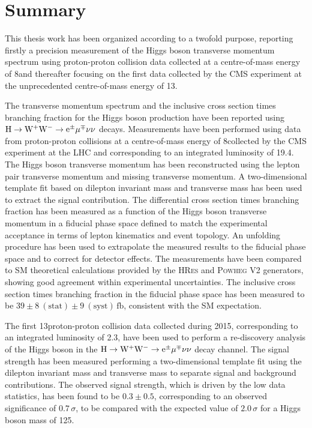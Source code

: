 \chapter*{Summary}
\thispagestyle{empty}

This thesis work has been organized according to a twofold purpose, reporting firstly a precision measurement of the Higgs boson transverse momentum spectrum using proton-proton collision data collected at a centre-of-mass energy of 8\TeV and thereafter focusing on the first data collected by the CMS experiment at the unprecedented centre-of-mass energy of 13\TeV.

The transverse momentum spectrum and the inclusive cross section times branching fraction for the Higgs boson production have been reported using $\rm{H}\to\rm{W^+W^-}\to e^{\pm} \mu^{\mp}\nu\nu$ decays. Measurements have been performed using data from proton-proton collisions at a centre-of-mass energy of 8\TeV collected by the CMS experiment at the LHC and corresponding to an integrated luminosity of 19.4\ifb. The Higgs boson transverse momentum has been reconstructed using the lepton pair transverse momentum and missing transverse momentum. A two-dimensional template fit based on dilepton invariant mass and transverse mass has been used to extract the signal contribution. The differential cross section times branching fraction has been measured as a function of the Higgs boson transverse momentum in a fiducial phase space defined to match the experimental acceptance in terms of lepton kinematics and event topology. An unfolding procedure has been used to extrapolate the measured results to the fiducial phase space and to correct for detector effects.
The measurements have been compared to SM theoretical calculations provided by the \textsc{HRes} and \textsc{Powheg V2} generators, showing good agreement within experimental uncertainties. The inclusive cross section times branching fraction in the fiducial phase space has been measured to be $39\pm 8~(\mathrm{stat}) \pm 9~(\mathrm{syst})\,\mathrm{fb}$, consistent with the SM expectation.

The first 13\TeV proton-proton collision data collected during 2015, corresponding to an integrated luminosity of 2.3\ifb, have been used to perform a re-discovery analysis of the Higgs boson in the $\rm{H}\to\rm{W^+W^-}\to e^{\pm} \mu^{\mp}\nu\nu$ decay channel. The signal strength has been measured performing a two-dimensional template fit using the dilepton invariant mass and transverse mass to separate signal and background contributions.
The observed signal strength, which is driven by the low data statistics, has been found to be $0.3\pm0.5$, corresponding to an observed significance of $0.7\,\sigma$, to be compared with the expected value of $2.0\,\sigma$ for a Higgs boson mass of 125\GeV.

